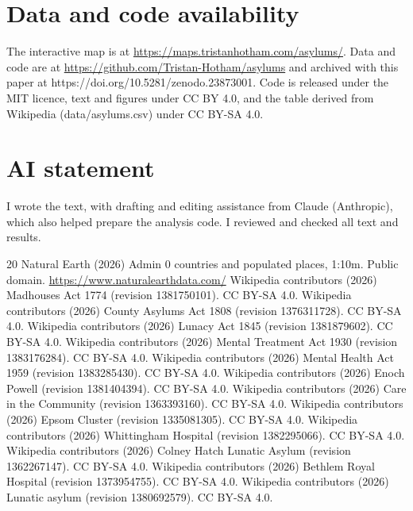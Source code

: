 \documentclass[11pt,a4paper]{article}
\begin{document}
\section*{Data and code availability}
The interactive map is at \url{https://maps.tristanhotham.com/asylums/}. Data and code are at \url{https://github.com/Tristan-Hotham/asylums} and archived with this paper at https://doi.org/10.5281/zenodo.23873001. Code is released under the MIT licence, text and figures under CC BY 4.0, and the table derived from Wikipedia (data/asylums.csv) under CC BY-SA 4.0.

\section*{AI statement}
I wrote the text, with drafting and editing assistance from Claude (Anthropic), which also helped prepare the analysis code. I reviewed and checked all text and results.

\begin{thebibliography}{20}
 Natural Earth (2026) Admin 0 countries and populated places, 1:10m. Public domain. \url{https://www.naturalearthdata.com/}
 Wikipedia contributors (2026) Madhouses Act 1774 (revision 1381750101). CC BY-SA 4.0.
 Wikipedia contributors (2026) County Asylums Act 1808 (revision 1376311728). CC BY-SA 4.0.
 Wikipedia contributors (2026) Lunacy Act 1845 (revision 1381879602). CC BY-SA 4.0.
 Wikipedia contributors (2026) Mental Treatment Act 1930 (revision 1383176284). CC BY-SA 4.0.
 Wikipedia contributors (2026) Mental Health Act 1959 (revision 1383285430). CC BY-SA 4.0.
 Wikipedia contributors (2026) Enoch Powell (revision 1381404394). CC BY-SA 4.0.
 Wikipedia contributors (2026) Care in the Community (revision 1363393160). CC BY-SA 4.0.
 Wikipedia contributors (2026) Epsom Cluster (revision 1335081305). CC BY-SA 4.0.
 Wikipedia contributors (2026) Whittingham Hospital (revision 1382295066). CC BY-SA 4.0.
 Wikipedia contributors (2026) Colney Hatch Lunatic Asylum (revision 1362267147). CC BY-SA 4.0.
 Wikipedia contributors (2026) Bethlem Royal Hospital (revision 1373954755). CC BY-SA 4.0.
 Wikipedia contributors (2026) Lunatic asylum (revision 1380692579). CC BY-SA 4.0.
\end{thebibliography}
\end{document}
